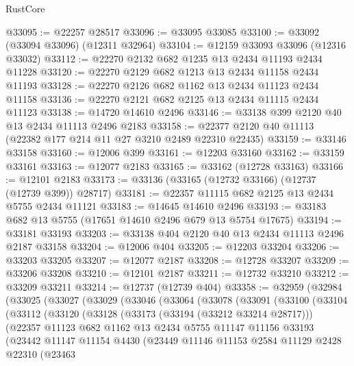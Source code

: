 \begin{lexlean}{RustCore}
\begin{coremodule}
@33095 := @22257 @28517
@33096 := @33095 @33085
@33100 := @33092 (@33094 @33096) (@12311 @32964)
@33104 := @12159 @33093 @33096 (@12316 @33032)
@33112 := @22270 @2132 @682 @1235 @13 @2434 @11193 @2434 @11228
@33120 := @22270 @2129 @682 @1213 @13 @2434 @11158 @2434 @11193
@33128 := @22270 @2126 @682 @1162 @13 @2434 @11123 @2434 @11158
@33136 := @22270 @2121 @682 @2125 @13 @2434 @11115 @2434 @11123
@33138 := @14720 @14610 @2496
@33146 := @33138 @399 @2120 @40 @13 @2434 @11113 @2496 @2183
@33158 := @22377 @2120 @40 @11113 (@22382 @177 @214 @11 @27 @3210 @2489 @22310 @22435)
@33159 := @33146 @33158
@33160 := @12006 @399
@33161 := @12203 @33160
@33162 := @33159 @33161
@33163 := @12077 @2183
@33165 := @33162 (@12728 @33163)
@33166 := @12101 @2183
@33173 := @33136 (@33165 (@12732 @33166) (@12737 (@12739 @399)) @28717)
@33181 := @22357 @11115 @682 @2125 @13 @2434 @5755 @2434 @11121
@33183 := @14645 @14610 @2496
@33193 := @33183 @682 @13 @5755 (@17651 @14610 @2496 @679 @13 @5754 @17675)
@33194 := @33181 @33193
@33203 := @33138 @404 @2120 @40 @13 @2434 @11113 @2496 @2187 @33158
@33204 := @12006 @404
@33205 := @12203 @33204
@33206 := @33203 @33205
@33207 := @12077 @2187
@33208 := @12728 @33207
@33209 := @33206 @33208
@33210 := @12101 @2187
@33211 := @12732 @33210
@33212 := @33209 @33211
@33214 := @12737 (@12739 @404)
@33358 := @32959
    (@32984
      (@33025
        (@33027
          (@33029
            (@33046
              (@33064
                (@33078
                  (@33091
                    (@33100
                      (@33104
                        (@33112
                          (@33120
                            (@33128
                              (@33173 (@33194 (@33212 @33214 @28717)))
                              (@22357
                                @11123
                                @682
                                @1162
                                @13
                                @2434
                                @5755
                                @11147
                                @11156
                                @33193
                                (@23442
                                  @11147
                                  @11154
                                  @4430
                                  (@23449
                                    @11146
                                    @11153
                                    @2584
                                    @11129
                                    @2428
                                    @22310
                                    (@23463

\end{coremodule}
\end{lexlean}

